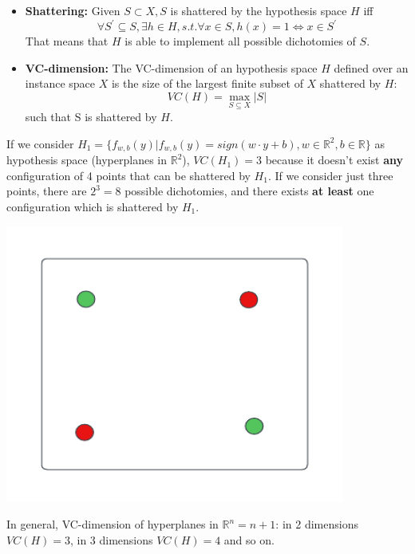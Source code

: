 \begin{itemize}
    \item \textbf{Shattering: } Given $S \subset X, S$ is shattered by the hypothesis space $H$ iff 
    \[\forall S^{'} \subseteq S, \exists h \in H, s.t. \forall x \in S, h(x) = 1 \iff x \in S^{'}\]
    That means that $H$ is able to implement all possible dichotomies of $S$.
    
    \item \textbf{VC-dimension: } The VC-dimension of an hypothesis space $H$ defined over an instance space $X$ is the size of the largest finite subset of $X$ shattered by $H$: 
    \[VC(H) = \max_{S \subseteq X}|S|\]
    such that S is shattered by $H$.
\end{itemize}
If we consider $H_{1} = \{f_{w,b}(y) | f_{w,b}(y) = sign(w \cdot y + b), w \in \mathbb{R}^{2}, b \in \mathbb{R}\}$ as hypothesis space (hyperplanes in $\mathbb{R}^{2}$), $VC(H_{1}) = 3$ because it doesn't exist \textbf{any} configuration of 4 points that can be shattered by $H_{1}$. If we consider just three points, there are $2^3 = 8$ possible dichotomies, and there exists \textbf{at least} one configuration which is shattered by $H_1$.
\begin{center}
    \includegraphics[scale=0.6]{images/dichotomy 3.png}
\end{center}
In general, VC-dimension of hyperplanes in $\mathbb{R}^{n} = n + 1$: in 2 dimensions $VC(H) = 3$, in 3 dimensions $VC(H) = 4$ and so on.
